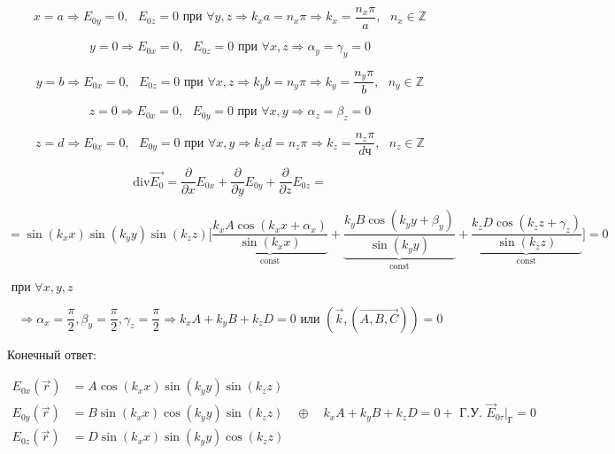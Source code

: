 \documentclass[12pt, a4paper]{report}
\begin{document}
    \[ x = a \Rightarrow E_{0y }  =0, \text{ }  E_{0z } = 0 \text{ при }  \forall  y ,z  \Rightarrow k_x a = n_x \pi \Rightarrow k_x = \frac{ n_x \pi } {a } , \text{ }  n_x \in  \mathbb{Z}    \] 

    \[ y = 0 \Rightarrow E_{0x } = 0, \text{ }  E_{0z } = 0 \text{ при } \forall x,z \Rightarrow \alpha_y = \gamma _y = 0  \] 

    \[ y = b \Rightarrow E_{0x } = 0, \text{ }  E_{0z } = 0 \text{ при } \forall x,z \Rightarrow k_y b = n_y \pi \Rightarrow k_y = \frac{ n_y \pi } {b } , \text{ }  n_y \in  \mathbb{Z}    \] 

    \[ z= 0 \Rightarrow E_{0x } = 0, \text{ }  E_{0y } = 0 \text{ при } \forall x,y \Rightarrow \alpha_z = \beta _z = 0  \] 

    \[ z= d \Rightarrow E_{0x } = 0, \text{ }  E_{0y } = 0 \text{ при } \forall x,y \Rightarrow k_z d = n_z \pi \Rightarrow k_z = \frac{ n_z \pi } {dч } , \text{ }  n_z \in  \mathbb{Z}    \] 

    \[ \mathrm{div } \vec{E_0} = \frac{\partial  }{\partial  x } E_{0x} + \frac{\partial  }{\partial  y } E_{0y } + \frac{\partial  }{\partial  z }E _{0z } =       \] 

    \[ =\sin (k_x x) \sin (k_y y )\sin (k_z z) \bigg[ \underbrace{\frac{k_xA \cos (k_x x + \alpha_x) }{\sin (k_x x)}}_{\mathrm{const} }+ \underbrace{\frac{k_yB \cos (k_y y + \beta_y) }{\sin (k_y y)}}_{\mathrm{const}} + \underbrace{\frac{k_z D  \cos (k_z  z+ \gamma_z) }{\sin (k_z  z)}}_{\mathrm{const}}  \bigg]  = 0       \] 


    \( \text{ при } \forall  x, y , z \) 

    \[ \Rightarrow \alpha_x = \frac{\pi}{2 }  , \beta_y = \frac{\pi}{2 } , \gamma_z = \frac{\pi}{2 } \Rightarrow k_x A + k_y B + k_z D = 0 \text{  или }   (\vec{k } , (\overrightarrow{A,B,C}) ) = 0  \] 

    Конечный ответ: 

    \[ \begin{aligned}
        E_{0x }  (\vec{r } ) &= A \cos (k_x x )\sin (k_y y )\sin (k_z z) \\
        E_{0y}(\vec{r} ) &= B \sin (k_x x )\cos (k_y y )\sin (k_z z)  \quad  \oplus \quad k_x A + k_y B + k_z D = 0 + \text{ Г.У. } \vec{E} _{0 \tau } |_{\text{Г} } = 0      \\
        E_{0z}(\vec{r} ) &= D \sin (k_x x )\sin (k_y y )\cos (k_z z) 
    \end{aligned} \] 



\ifdefined\mainfile
\else
    
\end{document}
